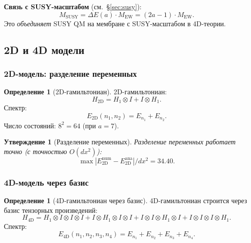 \documentclass[11pt,a4paper]{article}
\newtheorem{proposition}[theorem]{Утверждение}
\theoremstyle{definition}
\newtheorem{definition}[theorem]{Определение}
\begin{document}
\medskip\noindent
\textbf{Связь с SUSY-масштабом} (см.~\S\ref{sec:susy}):
\begin{equation}
    M_{\text{SUSY}} = \Delta E(a) \cdot M_{\text{EW}} = (2a-1) \cdot M_{\text{EW}}.
    \label{eq:membrane-MSUSY-link}
\end{equation}
Это \emph{объединяет} SUSY QM на мембране с SUSY-масштабом
в 4D-теории.

\subsection{2D и 4D модели}
\label{subsec:membrane-2D-4D}

\subsubsection{2D-модель: разделение переменных}

\begin{definition}[2D-гамильтониан]
\label{def:membrane-2D}
2D-гамильтониан:
\begin{equation}
    H_{\text{2D}} = H_1 \otimes I + I \otimes H_1.
    \label{eq:membrane-H2D}
\end{equation}
Спектр:
\begin{equation}
    E_{\text{2D}}(n_1, n_2) = E_{n_1} + E_{n_2}.
    \label{eq:membrane-spectrum-2D}
\end{equation}
Число состояний: $8^2 = 64$ (при $a = 7$).
\end{definition}

\begin{proposition}[Разделение переменных]
\label{prop:membrane-2D-separation}
Разделение переменных работает \emph{точно} (с точностью $O(dx^2)$):
\begin{equation}
    \max\left|E_{\text{2D}}^{\text{num}} - E_{\text{2D}}^{\text{ana}}\right| / dx^2 = 34.40.
    \label{eq:membrane-2D-ratio}
\end{equation}
\end{proposition}

\subsubsection{4D-модель через базис}

\begin{definition}[4D-гамильтониан через базис]
\label{def:membrane-4D}
4D-гамильтониан строится через базис тензорных произведений:
\begin{equation}
    H_{\text{4D}} = H_1 \otimes I \otimes I \otimes I
    + I \otimes H_1 \otimes I \otimes I
    + I \otimes I \otimes H_1 \otimes I
    + I \otimes I \otimes I \otimes H_1.
    \label{eq:membrane-H4D}
\end{equation}
Спектр:
\begin{equation}
    E_{\text{4D}}(n_1, n_2, n_3, n_4) = E_{n_1} + E_{n_2} + E_{n_3} + E_{n_4}.
    \label{eq:membrane-spectrum-4D}
\end{equation}
\end{definition}
\end{document}
